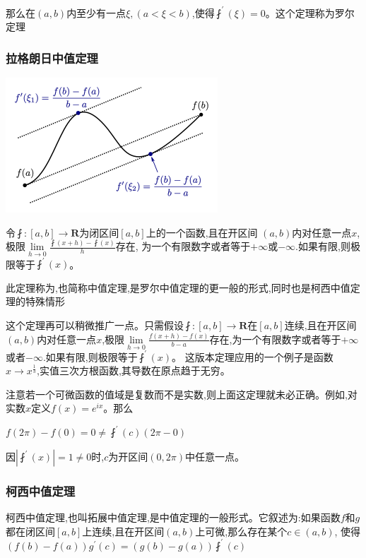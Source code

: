 \documentclass[UTF8]{ctexbook}
\newcommand{\limNormal}[1]{\lim\limits_{#1}}
\newcommand{\derivative}{^\prime}
\newcommand{\fDerivative}[1]{\fint\derivative(#1)}
\newcommand{\defFunction}[1]{f(#1)}
\begin{document}
{{{{  那么在$(a,b)$内至少有一点$\xi, (a<\xi<b)$,使得$\fint\derivative(\xi) = 0$。这个定理称为罗尔定理
}%

\subsubsection{拉格朗日中值定理}{
\includegraphics{resources/Lagrange's_mean_value_theorem.png}

令$\fint : [a,b] \to \mathbf{R}$为闭区间$[a,b]$上的一个函数,且在开区间
$(a,b)$内对任意一点$x$,极限$\limNormal{h \to 0}\frac{\fint(x + h) - \fint(x)}{h}$存在,
为一个有限数字或者等于$+\infty$或$-\infty$.如果有限,则极限等于$\fDerivative{x}$。

此定理称为{},也简称中值定理,是罗尔中值定理的更一般的形式,同时也是柯西中值定理的特殊情形

这个定理再可以稍微推广一点。只需假设$\fint : [a,b] \to \mathbf{R}$在$[a,b]$连续,且在开区间$(a,b)$内对任意一点$x$,极限$\limNormal{h \to 0}
  \frac{\defFunction{x + h} - \defFunction{x}}{b - a}$存在,为一个有限数字或者等于$+\infty$或者$-\infty$.如果有限,则极限等于$\fDerivative{x}$。
这版本定理应用的一个例子是函数$x \to x^{\frac{1}{3}}$,实值三次方根函数,其导数在原点趋于无穷。

注意若一个可微函数的值域是复数而不是实数,则上面这定理就未必正确。例如,对实数$x$定义$\defFunction{x} = e^{ix}$。那么

$\defFunction{2\pi} - \defFunction{0} = 0 \neq \fDerivative{c}(2\pi - 0)$

因$|\fDerivative{x}| = 1 \neq 0$时,$c$为开区间$(0,2\pi)$中任意一点。
}%

\subsubsection{柯西中值定理}{
  柯西中值定理,也叫拓展中值定理,是中值定理的一般形式。它叙述为:如果函数$f$和$g$都在闭区间$[a,b]$上连续,且在开区间$(a,b)$上可微,那么存在某个$c \in (a,b)$,
  使得$(\defFunction{b} - \defFunction{a})g\derivative(c) = (g(b)-g(a))\fDerivative{c}$

}}}}
\end{document}
